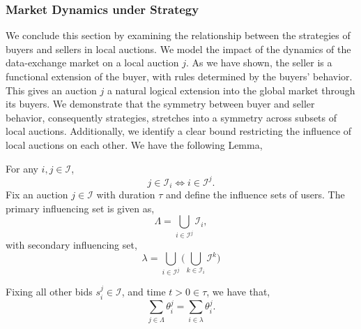 \documentclass[12pt]{article}
\theoremstyle{definition}
\newcommand{\mcI}{\mathcal{I}}
\begin{document}
\begin{multicols}{2}
\subsubsection{Market Dynamics under Strategy}

We conclude this section by examining the relationship between the strategies of buyers and
sellers in local auctions. We model the impact of the dynamics of the
data-exchange market on a local auction $j$. As we have shown, the seller
is a functional extension of the buyer, with rules determined by the buyers'
behavior. This gives an auction $j$ a natural logical extension into the
global market through its buyers. We demonstrate that the symmetry between
buyer and seller behavior, consequently strategies, stretches into a symmetry across subsets of local
auctions. Additionally, we identify a clear bound restricting the influence of
local auctions on each other. We have the following Lemma,
{
\label{userunion}
For any $i,j\in \mcI$, 
\begin{equation}\label{jtoi}
j\in\mcI_i \Leftrightarrow i\in\mcI^j.
\end{equation}
Fix an auction $j\in\mcI$ with duration $\tau$ and define the influence sets of users. 
The primary influencing set is given as,
\begin{equation}\label{lambda}
    \Lambda = \displaystyle\bigcup_{i\in\mcI^j} \mcI_i,
\end{equation}
with secondary influencing set,
\begin{equation}\label{llambda}
    \lambda = \bigcup_{i\in\mcI^j} \bigg(\bigcup_{k\in\mcI_i} \mcI^k \bigg)
\end{equation}
\iffalse
(THE SELLERS ALL THE BUYERS IN $j$ HAVE IN COMMON! i.e. $j$ AND...)
\begin{equation}%
    \Lambda = \displaystyle\bigcap_{i\in\mcI^j} \mcI_i,
\end{equation}
(THE COLLECTION OF BUYERS FROM EACH $i$ THAT ARE COMMON ACROSS ALL THE $i$'s SELLER
POOLS)
\begin{equation}%
    \lambda = \bigcup_{i\in\mcI^j} \bigg(\bigcap_{k\in\mcI_i} \mcI^k \bigg)
\end{equation}
\fi
Fixing all other bids $s_i^j \in \mcI$, and time $t>0\in\tau$, we have that,
\begin{equation}\label{unioneq}
    \displaystyle\sum_{j\in\Lambda} \theta_i^j = \sum_{i\in\lambda} \theta_i^j.

\end{equation}}
\end{multicols}
\end{document}
